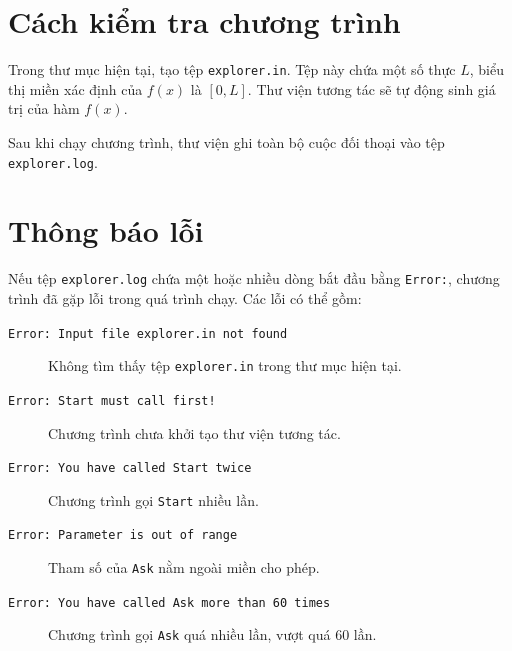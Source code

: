 \documentclass[11pt]{article}
\begin{document}
\section{Cách kiểm tra chương trình}

Trong thư mục hiện tại, tạo tệp \texttt{explorer.in}. Tệp này chứa một số
thực \(L\), biểu thị miền xác định của \(f(x)\) là \([0,L]\). Thư viện tương
tác sẽ tự động sinh giá trị của hàm \(f(x)\).

Sau khi chạy chương trình, thư viện ghi toàn bộ cuộc đối thoại vào tệp
\texttt{explorer.log}.

\section{Thông báo lỗi}

Nếu tệp \texttt{explorer.log} chứa một hoặc nhiều dòng bắt đầu bằng
\texttt{Error:}, chương trình đã gặp lỗi trong quá trình chạy. Các lỗi có thể
gồm:
\begin{description}
  \item[\texttt{Error: Input file explorer.in not found}] Không tìm thấy tệp
  \texttt{explorer.in} trong thư mục hiện tại.
  \item[\texttt{Error: Start must call first!}] Chương trình chưa khởi tạo thư
  viện tương tác.
  \item[\texttt{Error: You have called Start twice}] Chương trình gọi
  \texttt{Start} nhiều lần.
  \item[\texttt{Error: Parameter is out of range}] Tham số của \texttt{Ask}
  nằm ngoài miền cho phép.
  \item[\texttt{Error: You have called Ask more than 60 times}] Chương trình
  gọi \texttt{Ask} quá nhiều lần, vượt quá \(60\) lần.
\end{description}
\end{document}
